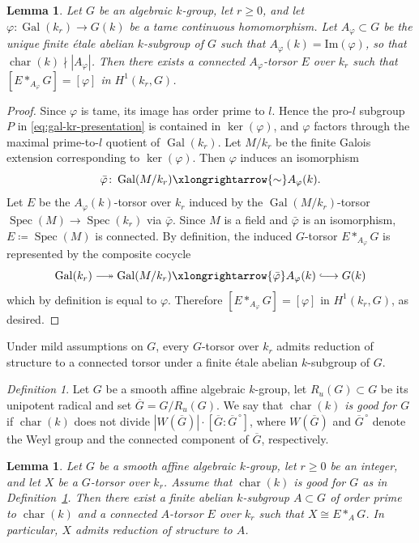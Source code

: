 \documentclass[12pt]{amsart}
\numberwithin{equation}{section}
\newtheorem{lemma}[theorem]{Lemma}
\theoremstyle{remark}
\newtheorem{definition}[theorem]{Definition}
\newcommand{\ol}{\overline}
\newcommand{\vphi}{\varphi}
\newcommand{\Gal}{\operatorname{Gal}}
\newcommand{\Spec}{\operatorname{Spec}}
\newcommand{\Char}{\operatorname{char}}
\begin{document}
\begin{lemma}\label{lem.tame_hom_is_loop}
Let $G$ be an algebraic $k$-group, let $r\geqslant 0$, and let $\vphi\colon \Gal(k_r)\to G(k)$ be a tame continuous homomorphism. Let $A_\vphi\subset G$ be the unique finite \'etale abelian $k$-subgroup of $G$ such that $A_\vphi(k)=\mathrm{Im}(\vphi)$, so that $\Char(k)\nmid |A_{\vphi}|$. Then there exists a connected $A_\vphi$-torsor $E$ over $k_r$ such that $[E*_{A_\vphi}G]=[\vphi]$ in $H^1(k_r,G)$.
\end{lemma}
\begin{proof}
Since $\vphi$ is tame, its image has order prime to $l$. Hence the
pro-$l$ subgroup $P$ in \eqref{eq:gal-kr-presentation} is contained in
$\ker(\vphi)$, and $\vphi$ factors through the maximal prime-to-$l$
quotient of $\Gal(k_r)$. Let $M/k_r$ be the finite Galois extension corresponding to $\ker(\vphi)$. Then $\vphi$ induces an isomorphism
\[
    \bar{\vphi}\colon \Gal(M/k_r) \xlongrightarrow{\sim} A_\vphi(k).
\]
Let $E$ be the $A_\vphi(k)$-torsor over $k_r$ induced by the $\Gal(M/k_r)$-torsor $\Spec(M)\to\Spec(k_r)$ via $\bar{\vphi}$. Since $M$ is a field and $\bar{\vphi}$ is an isomorphism, $E\coloneqq\Spec(M)$ is connected. By definition, the induced $G$-torsor
$E*_{A_\vphi}G$ is represented by the composite cocycle
\[
  \Gal(k_r)
  \mathrel{\relbar\joinrel\twoheadrightarrow}
  \Gal(M/k_r)
  \xlongrightarrow{\bar{\vphi}}
  A_\vphi(k)
  \mathrel{\lhook\joinrel\longrightarrow}
  G(k)
\]
which by definition is equal to $\vphi$. Therefore
$[E*_{A_\vphi}G]=[\vphi]$ in $H^1(k_r,G)$, as desired.
\end{proof}
Under mild assumptions on $G$, every $G$-torsor over $k_r$ admits reduction of structure to a connected torsor under a finite \'etale abelian $k$-subgroup of $G$.


\begin{definition}\label{def.good_char}
    Let $G$ be a smooth affine algebraic $k$-group, let $R_u(G) \subset G$ be its unipotent radical and set $\ol{G} = G/R_u(G)$. We say that \emph{$\Char(k)$ is good for $G$} if $\Char(k)$ does not divide $|W(\ol{G})| \cdot [\ol{G}:\ol{G}^{\,\circ}]$, where
    $W(\ol{G})$ and $\ol{G}^{\, \circ}$ denote the Weyl group and the connected component of $\ol{G}$, respectively.
\end{definition}

\begin{lemma}\label{lem.serre_quest}
Let $G$ be a smooth affine algebraic $k$-group, let $r\geqslant 0$ be an integer, and let $X$ be a $G$-torsor over $k_r$.   Assume that $\Char(k)$ is good for $G$ as in Definition~\ref{def.good_char}. Then there exist a finite abelian $k$-subgroup $A \subset G$ of order prime to $\Char(k)$ and a connected $A$-torsor $E$ over $k_r$ such that $X\cong E*_AG$. In particular, $X$ admits reduction of structure to $A$.
\end{lemma}
\end{document}
